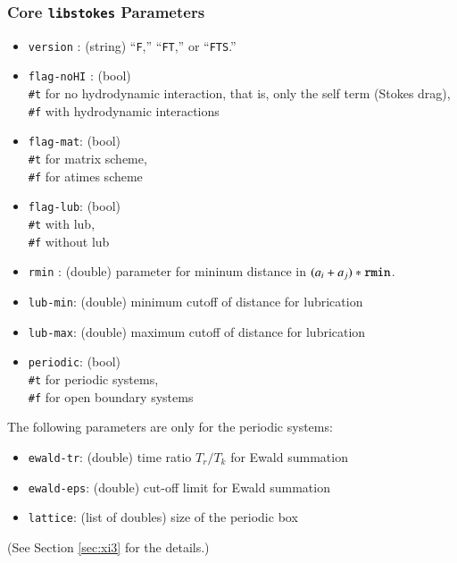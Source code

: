 \documentclass{book}
\begin{document}
\subsubsection{Core {\tt libstokes} Parameters}
\begin{itemize}
\item {\tt version} : (string) ``{\tt F},'' ``{\tt FT},'' or ``{\tt FTS}.''
\item {\tt flag-noHI} : (bool)\\
  {\tt \#t} for no hydrodynamic interaction, 
  that is, only the self term (Stokes drag),\\
  {\tt \#f} with hydrodynamic interactions
\item {\tt flag-mat}: (bool)\\
  {\tt \#t} for matrix scheme,\\
  {\tt \#f} for atimes scheme
\item {\tt flag-lub}: (bool)\\
  {\tt \#t} with lub,\\
  {\tt \#f} without lub
\item {\tt rmin} : (double) parameter for mininum distance in
  $(a_{i}+a_{j})\ {\tt *\ rmin}$.
\item {\tt lub-min}: (double) minimum cutoff of distance for lubrication
\item {\tt lub-max}: (double) maximum cutoff of distance for lubrication
\item {\tt periodic}: (bool)\\
  {\tt \#t} for periodic systems,\\
  {\tt \#f} for open boundary systems
\end{itemize}
The following parameters are only for the periodic systems:
\begin{itemize}
\item {\tt ewald-tr}: (double) time ratio $T_r/T_k$ for Ewald summation
\item {\tt ewald-eps}: (double) cut-off limit for Ewald summation
\item {\tt lattice}: (list of doubles) size of the periodic box
\end{itemize}
(See Section \ref{sec:xi3} for the details.)
\end{document}
